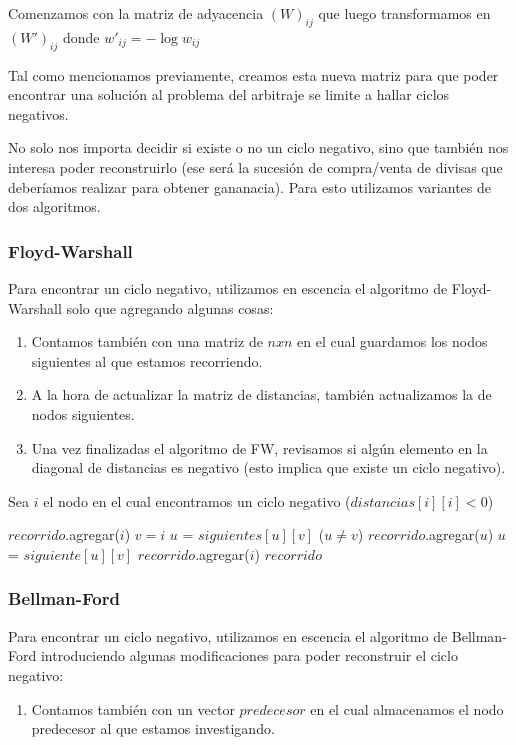 \par Comenzamos con la matriz de adyacencia $(W)_{ij}$ que luego transformamos en $(W')_{ij}$ donde $w'_{ij} = - \log w_{ij}$
\par Tal como mencionamos previamente, creamos esta nueva matriz para que poder encontrar una soluci\'on al problema
del arbitraje se limite a hallar ciclos negativos.
\par No solo nos importa decidir si existe o no un ciclo negativo, sino que tambi\'en nos interesa poder reconstruirlo
(ese ser\'a la sucesi\'on de compra/venta de divisas que deber\'iamos realizar para obtener gananacia). 
Para esto utilizamos variantes de dos algoritmos.
\subsubsection{Floyd-Warshall}
Para encontrar un ciclo negativo, utilizamos en escencia el algoritmo de Floyd-Warshall solo que agregando algunas
cosas:
\begin{enumerate}
\item Contamos tambi\'en con una matriz de $nxn$ en el cual guardamos los nodos siguientes al que estamos recorriendo.
\item A la hora de actualizar la matriz de distancias, tambi\'en actualizamos la de nodos siguientes.
\item Una vez finalizadas el algoritmo de FW, revisamos si alg\'un elemento en la diagonal de distancias es negativo
(esto implica que existe un ciclo negativo).
\end{enumerate}
Sea $i$ el nodo en el cual encontramos un ciclo negativo ($distancias[i][i] < 0$)

\begin{codebox}
    \li $recorrido$.agregar($i$)
    \li $v = i$
    \li $u$ = $siguientes[u][v]$
    \li \While ($u \neq v$)
        \Then
    \li     $recorrido$.agregar($u$)
    \li     $u$ = $siguiente[u][v]$
    \End
    \li $recorrido$.agregar($i$)
    \li \Return $recorrido$
\end{codebox}
\subsubsection{Bellman-Ford}
Para encontrar un ciclo negativo, utilizamos en escencia el algoritmo de Bellman-Ford introduciendo algunas
modificaciones para poder reconstruir el ciclo negativo:

\begin{enumerate}
\item Contamos tambi\'en con un vector $predecesor$ en el cual almacenamos el nodo predecesor al que
estamos investigando.
\end{enumerate}
